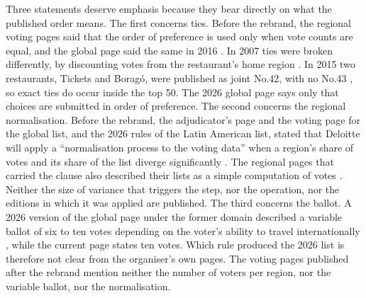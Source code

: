 \documentclass[11pt,a4paper]{article}
\begin{document}
Three statements deserve emphasis because they bear directly on what the published order means. The first concerns ties. Before the rebrand, the regional voting pages said that the order of preference is used only when vote counts are equal, and the global page said the same in 2016 \citep{asia50voting,upcoming2016}. In 2007 ties were broken differently, by discounting votes from the restaurant's home region \citep{restaurant2007}. In 2015 two restaurants, Tickets and Borag\'o, were published as joint No.42, with no No.43 \citep{w50b2015pictures}, so exact ties do occur inside the top 50. The 2026 global page says only that choices are submitted in order of preference. The second concerns the regional normalisation. Before the rebrand, the adjudicator's page and the voting page for the global list, and the 2026 rules of the Latin American list, stated that Deloitte will apply a ``normalisation process to the voting data'' when a region's share of votes and its share of the list diverge significantly \citep{w50bdeloitte,w50bvoting2026old,latam50voting}. The regional pages that carried the clause also described their lists as a simple computation of votes \citep{asia50voting,latam50voting}. Neither the size of variance that triggers the step, nor the operation, nor the editions in which it was applied are published. The third concerns the ballot. A 2026 version of the global page under the former domain described a variable ballot of six to ten votes depending on the voter's ability to travel internationally \citep{w50bvoting2026old}, while the current page states ten votes. Which rule produced the 2026 list is therefore not clear from the organiser's own pages. The voting pages published after the rebrand mention neither the number of voters per region, nor the variable ballot, nor the normalisation.
\end{document}
